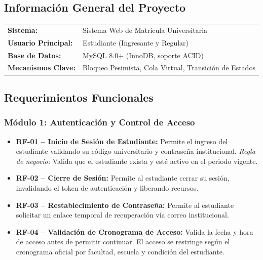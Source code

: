 \documentclass[12pt,a4paper]{article}
\begin{document}
\subsection{Informaci\'on General del Proyecto}

\begin{infobox}
  \begin{tabular}{ll}
    \textbf{Sistema:}      & Sistema Web de Matr\'icula Universitaria \\
    \textbf{Usuario Principal:} & Estudiante (Ingresante y Regular) \\
    \textbf{Base de Datos:}     & MySQL 8.0+ (InnoDB, soporte ACID) \\
    \textbf{Mecanismos Clave:}  & Bloqueo Pesimista, Cola Virtual, Transici\'on de Estados \\
  \end{tabular}
\end{infobox}

\subsection{Requerimientos Funcionales}

\subsubsection{M\'odulo 1: Autenticaci\'on y Control de Acceso}

\begin{itemize}[leftmargin=*]
  \item \textbf{RF-01 -- Inicio de Sesi\'on de Estudiante:}
    Permite el ingreso del estudiante validando su c\'odigo universitario y contrase\~na institucional.
    \textit{Regla de negocio:} Valida que el estudiante exista y est\'e activo en el periodo vigente.

  \item \textbf{RF-02 -- Cierre de Sesi\'on:}
    Permite al estudiante cerrar su sesi\'on, invalidando el token de autenticaci\'on y liberando recursos.

  \item \textbf{RF-03 -- Restablecimiento de Contrase\~na:}
    Permite al estudiante solicitar un enlace temporal de recuperaci\'on v\'ia correo institucional.

  \item \textbf{RF-04 -- Validaci\'on de Cronograma de Acceso:}
    Valida la fecha y hora de acceso antes de permitir continuar. El acceso se restringe seg\'un el cronograma oficial por facultad, escuela y condici\'on del estudiante.
\end{itemize}
\end{document}
